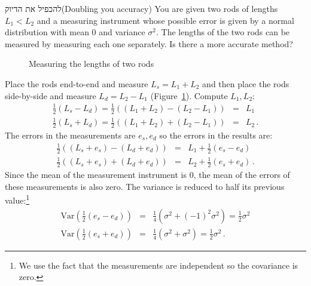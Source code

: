 

\begin{prob}{להכפיל את הדיוק}{}{(Doubling you accuracy)}
You are given two rods of lengths $L_1<L_2$ and a measuring instrument whose possible error is given by a normal distribution with mean $0$ and variance $\sigma^2$. The lengths of the two rods can be measured by measuring each one separately. Is there a more accurate method?
\end{prob}

\solution{}

\begin{figure}[bt]
\begin{center}
\end{center}
\caption{Measuring the lengths of two rods}\label{f.rods}
\end{figure}
Place the rods end-to-end and measure $L_s=L_1+L_2$ and then place the rods side-by-side and measure $L_d=L_2-L_1$ (Figure~\ref{f.rods}). Compute $L_1,L_2$:
\begin{eqnarray*}
\textstyle\frac{1}{2}(L_s-L_d)=\frac{1}{2}((L_1+L_2)-(L_2-L_1))&=&L_1\\
\textstyle\frac{1}{2}(L_s+L_d)=\frac{1}{2}((L_1+L_2)+(L_2-L_1))&=&L_2\,.
\end{eqnarray*}
The errors in the measurements are $e_s, e_d$ so the errors in the results are:
\begin{eqnarray*}
\textstyle\frac{1}{2}((L_s+e_s)-(L_d+e_d))&=&L_1+\textstyle\frac{1}{2}(e_s-e_d)\\
\textstyle\frac{1}{2}((L_s+e_s)+(L_d+e_d))&=&L_2+\textstyle\frac{1}{2}(e_s+e_d)\,.
\end{eqnarray*}
Since the mean of the measurement instrument is $0$, the mean of the errors of these measurements is also zero. The variance is reduced to half its previous value:\footnote{We use the fact that the measurements are independent so the covariance is zero.}
\begin{eqnarray*}
\mathrm{Var}\left(\textstyle\frac{1}{2}\left(e_s-e_d\right)\right)&=&
  \textstyle\frac{1}{4}(\sigma^2+(-1)^2\sigma^2)=\frac{1}{2}\sigma^2\\
\mathrm{Var}\left(\textstyle\frac{1}{2}(e_s+e_d)\right)&=&
  \textstyle\frac{1}{4}( \sigma^2+\sigma^2)=\frac{1}{2}\sigma^2\,.
\end{eqnarray*}


